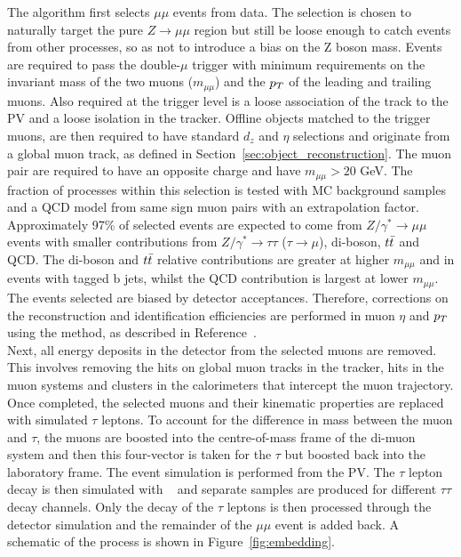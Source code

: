 The algorithm first selects $\mu\mu$ events from data.
The selection is chosen to naturally target the pure $Z \rightarrow \mu\mu$ region but still be loose enough to catch events from other processes, so as not to introduce a bias on the Z boson mass.
Events are required to pass the double-$\mu$ trigger with minimum requirements on the invariant mass of the two muons ($m_{\mu\mu}$) and the $p_{T}$ of the leading and trailing muons.
Also required at the trigger level is a loose association of the track to the \ac{PV} and a loose isolation in the tracker.
Offline objects matched to the trigger muons, are then required to have standard $d_z$ and $\eta$ selections and originate from a global muon track, as defined in Section~\ref{sec:object_reconstruction}.
The muon pair are required to have an opposite charge and have $m_{\mu\mu} > 20$ GeV.
The fraction of processes within this selection is tested with \ac{MC} background samples and a \ac{QCD} model from same sign muon pairs with an extrapolation factor.
Approximately 97\% of selected events are expected to come from $Z/\gamma^* \rightarrow \mu\mu$ events with smaller contributions from $Z/\gamma^* \rightarrow \tau\tau$ ($\tau\rightarrow\mu$), di-boson, $t\bar{t}$ and QCD.
The di-boson and $t\bar{t}$ relative contributions are greater at higher $m_{\mu\mu}$ and in events with tagged b jets, whilst the \ac{QCD} contribution is largest at lower $m_{\mu\mu}$.
The events selected are biased by detector acceptances. 
Therefore, corrections on the reconstruction and identification efficiencies are performed in muon $\eta$ and $p_{T}$ using the  method, as described in Reference~\cite{CMS:2010svw}. \\

Next, all energy deposits in the detector from the selected muons are removed.
This involves removing the hits on global muon tracks in the tracker, hits in the muon systems and clusters in the calorimeters that intercept the muon trajectory.
Once completed, the selected muons and their kinematic properties are replaced with simulated $\tau$ leptons.
To account for the difference in mass between the muon and $\tau$, the muons are boosted into the centre-of-mass frame of the di-muon system and then this four-vector is taken for the $\tau$ but boosted back into the laboratory frame.
The event simulation is performed from the \ac{PV}.
The $\tau$ lepton decay is then simulated with \PYTHIA~\cite{Sirunyan:2019dfx,Sjostrand:2014zea} and separate samples are produced for different $\tau\tau$ decay channels.
Only the decay of the $\tau$ leptons is then processed through the detector simulation and the remainder of the $\mu\mu$ event is added back.
A schematic of the process is shown in Figure~\ref{fig:embedding}. \\


